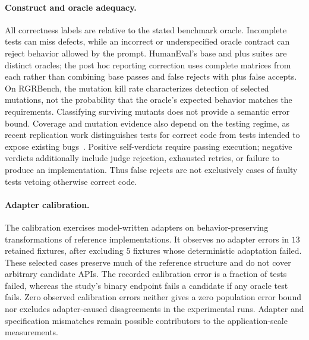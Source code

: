 \paragraph{Construct and oracle adequacy.} All correctness labels are relative to the stated
benchmark oracle. Incomplete tests can miss defects, while an incorrect or underspecified oracle
contract can reject behavior allowed by the prompt. HumanEval's base and plus suites are distinct
oracles; the post hoc reporting correction uses complete matrices from each rather than combining
base passes and false rejects with plus false accepts. On RGRBench, the mutation kill rate
characterizes detection of selected mutations, not the probability that the oracle's expected
behavior matches the requirements. Classifying surviving mutants does not provide a semantic
error bound. Coverage and mutation evidence also depend on the testing regime, as recent
replication work distinguishes tests for correct code from tests intended to expose existing
bugs~\cite{zhao2026coverage}. Positive self-verdicts require passing execution; negative verdicts additionally
include judge rejection, exhausted retries, or failure to produce an implementation. Thus false
rejects are not exclusively cases of faulty tests vetoing otherwise correct code.

\paragraph{Adapter calibration.} The calibration exercises model-written adapters on
behavior-preserving transformations of reference implementations. It observes no adapter errors
in $13$ retained fixtures, after excluding $5$ fixtures whose deterministic adaptation failed.
These selected cases preserve much of the reference structure and do not cover arbitrary
candidate APIs. The recorded calibration error is a fraction of tests failed, whereas the study's
binary endpoint fails a candidate if any oracle test fails. Zero observed calibration errors
neither gives a zero population error bound nor excludes adapter-caused disagreements in the
experimental runs. Adapter and specification mismatches remain possible contributors to the
application-scale measurements.

